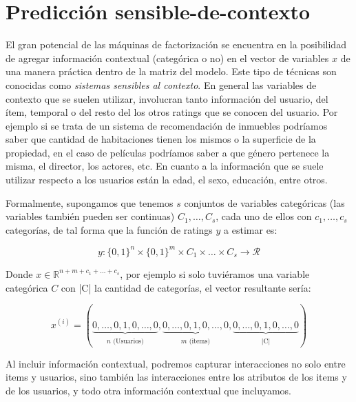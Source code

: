 \documentclass[hidelinks,12pt,a4paper]{book}
\theoremstyle{plain}
\theoremstyle{definition}
\begin{document}
\section{Predicción sensible-de-contexto}\label{context}

El gran potencial de las máquinas de factorización se encuentra en la posibilidad de agregar información contextual (categórica o no) en el vector de variables $x$ de una manera práctica dentro de la matriz del modelo. Este tipo de técnicas son conocidas como \textit{sistemas sensibles al contexto}\cite{agg}\cite{rendle2012factorization}. En general las variables de contexto que se suelen utilizar, involucran tanto información del usuario, del ítem, temporal o del resto del los otros ratings que se conocen del usuario. Por ejemplo si se trata de un sistema de recomendación de inmuebles podríamos saber que cantidad de habitaciones tienen los mismos o la superficie de la propiedad, en el caso de películas podríamos saber a que género pertenece la misma, el director, los actores, etc. En cuanto a la información que se suele utilizar respecto a los usuarios están la edad, el sexo, educación, entre otros.

Formalmente, supongamos que tenemos $s$ conjuntos de variables categóricas (las variables también pueden ser continuas) $C_1, \ldots, C_s$, cada uno de ellos con $c_1,\ldots,c_s$ categorías, de tal forma que la función de ratings $y$ a estimar es:

\begin{equation}
y:\{0,1\}^n \times \{0,1\}^m \times C_1 \times \ldots \times C_s \rightarrow \mathcal{R}
\end{equation}

Donde $x \in \mathbb{R}^{n+m+c_1+\ldots+c_s}$, por ejemplo si solo tuviéramos una variable categórica $C$ con |C| la cantidad de categorías, el vector resultante sería:

\begin{equation}
x^{(i)} = ( \underbrace{0,\ldots,0,1,0,\ldots,0}_{\substack{n\text{ (Usuarios)}}}, \underbrace{0,\ldots,0,1,0,\ldots,0}_{\substack{m\text{ (items)}}},  \underbrace{0,\ldots,0,1,0,\ldots,0}_{\substack{\text{|C|}}})
\end{equation}

Al incluir información contextual, podremos capturar interacciones no solo entre items y usuarios, sino también las interacciones entre los atributos de los items y de los usuarios, y todo otra información contextual que incluyamos.
\end{document}
